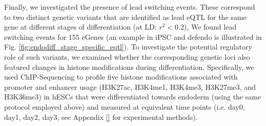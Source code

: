 Finally, we investigated the presence of lead switching events.
These correspond to two distinct genetic variants that are identified as lead eQTL for the same gene at different stages of differentiation (at LD: $r^2<0.2$),
We found lead switching events for 155 eGenes (an example in iPSC and defendo is illustrated in Fig. \ref{fig:endodiff_stage_specific_eqtl}). 
To investigate the potential regulatory role of such variants, we examined whether the corresponding genetic loci also featured changes in histone modifications during differentiation. 
Specifically, we used ChIP-Sequencing to profile five histone modifications associated with promoter and enhancer usage (H3K27ac, H3K4me1, H3K4me3, H3K27me3, and H3K36me3) in hESCs that were differentiated towards endoderm (using the same protocol employed above) and measured at equivalent time points (i.e. day0, day1, day2, day3, see Appendix \ref{} for experimental methods). 
